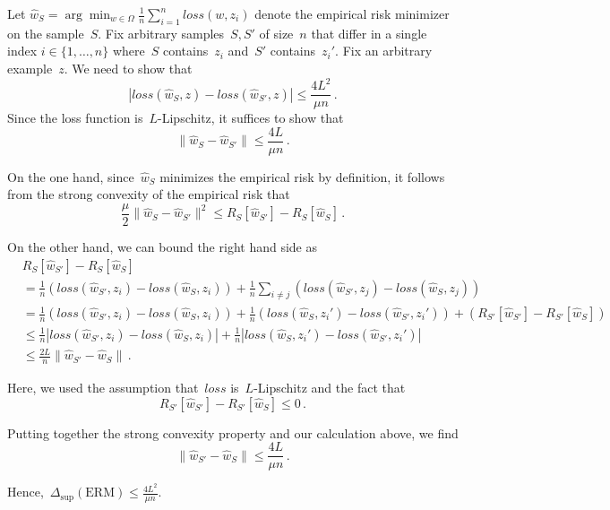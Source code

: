 \documentclass{tufte-book}
\begin{document}
\begin{Proof}

Let
\(\hat w_S = \arg \min_{w\in \Omega} \frac{1}{n} \sum_{i=1}^n\mathit{loss}(w, z_i)\)
denote the empirical risk minimizer on the sample~\(S.\) Fix arbitrary
samples~\(S,S'\) of size~\(n\) that differ in a single index
\(i\in\{1,\dots,n\}\) where~\(S\) contains~\(z_i\) and~\(S'\)
contains~\(z_i'\). Fix an arbitrary example~\(z\). We need to show that
\[
|\mathit{loss}(\hat w_{S}, z) - \mathit{loss}(\hat w_{S'}, z)|
\leq \frac{4 L^2}{\mu n}\,.
\] Since the loss function is~\(L\)-Lipschitz, it suffices to show that
\[
\| \hat w_{S} - \hat w_{S'} \| \leq \frac{4L}{\mu n}\,.
\]

On the one hand, since~\(\hat w_S\) minimizes the empirical risk by
definition, it follows from the strong convexity of the empirical risk
that \[
\frac{\mu}{2} \| \hat w_{S} - \hat w_{S'} \|^2
\le R_S[\hat w_{S'}] - R_S[\hat w_{S}]\,.
\]

On the other hand, we can bound the right hand side as \[
\begin{aligned}
& R_S[\hat w_{S'}] - R_S[\hat w_{S}]\\
&=  \frac{1}{n} ( \mathit{loss}(\hat w_{S'}, z_i) - \mathit{loss}(\hat w_{S}, z_i)) + \frac{1}{n} \sum_{i \neq j} ( \mathit{loss}(\hat w_{S'}, z_j) - \mathit{loss}(\hat w_{S}, z_j))\\
&=\frac{1}{n} (\mathit{loss}(\hat w_{S'}, z_i) - \mathit{loss}(\hat w_{S}, z_i))
+ \frac{1}{n} (\mathit{loss}(\hat w_{S}, z_i') - \mathit{loss}(\hat w_{S'}, z_i'))
+ \left(R_{S'}[\hat w_{S'}] - R_{S'}[\hat w_{S}]\right)\\
&\leq \frac{1}{n} | \mathit{loss}(\hat w_{S'}, z_i) - \mathit{loss}(\hat w_{S}, z_i)| +
\frac{1}{n} |  \mathit{loss}(\hat w_{S}, z_i') - \mathit{loss}(\hat w_{S'}, z_i') |\\
&\leq  \frac{2 L}{n} \| \hat w_{S'} - \hat w_{S}\|\,.
\end{aligned}
\]

Here, we used the assumption that~\(\mathit{loss}\) is~\(L\)-Lipschitz
and the fact that \[
R_{S'}[\hat w_{S'}] - R_{S'}[\hat w_{S}] \leq 0\,.
\]

Putting together the strong convexity property and our calculation
above, we find \[
\| \hat w_{S'} - \hat w_{S} \| \leq \frac{4 L}{\mu n}\,.
\]

Hence,~\(\Delta_{\mathrm{sup}}(\text{ERM}) \leq \frac{4 L ^ 2}{\mu n}\).

\end{Proof}
\end{document}
